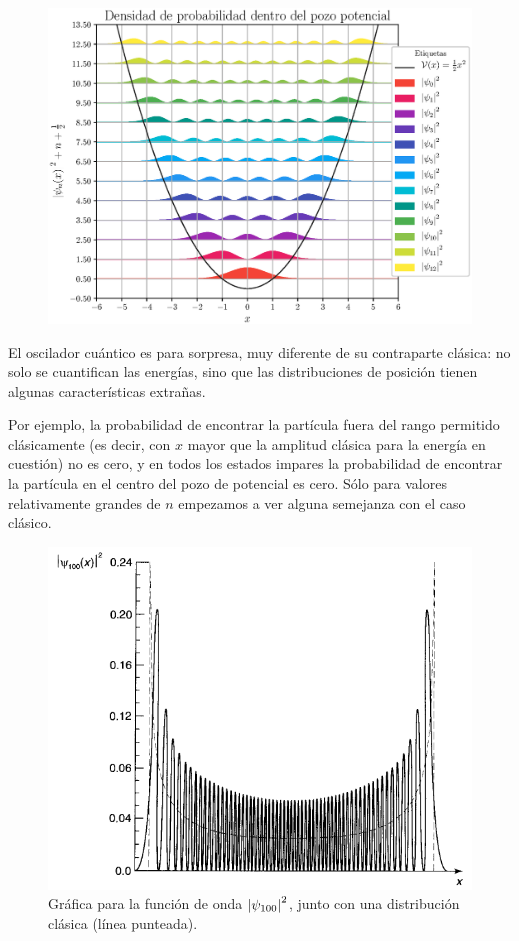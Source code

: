 \begin{figure}[H]
    \centering
    \includegraphics[scale=0.75]{Imagenes/Funciones_Normalizadas_01.eps}
\end{figure}

\newpage

El oscilador cuántico es para sorpresa, muy diferente de su contraparte clásica: no solo se cuantifican las energías, sino que las distribuciones de posición tienen algunas características extrañas. 
\par
Por ejemplo, la probabilidad de encontrar la partícula fuera del rango permitido clásicamente (es decir, con $x$ mayor que la amplitud clásica para la energía en cuestión) no es cero, y en todos los estados impares la probabilidad de encontrar la partícula en el centro del pozo de potencial es cero. Sólo para valores relativamente grandes de $n$ empezamos a ver alguna semejanza con el caso clásico. 
\begin{figure}[H]
    \centering
    \includegraphics[scale=0.5]{Imagenes/Funcion_Onda_100.png}
    \caption{Gráfica para la función de onda $\abs{\psi_{100}}^{2}$, junto con una distribución clásica (línea punteada).}
    \label{figura_004}
\end{figure}

